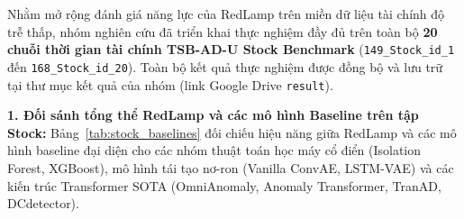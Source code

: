 \documentclass[sigconf,nonacm]{acmart}
\begin{document}
Nhằm mở rộng đánh giá năng lực của RedLamp trên miền dữ liệu tài chính độ trễ thấp, nhóm nghiên cứu đã triển khai thực nghiệm đầy đủ trên toàn bộ \textbf{20 chuỗi thời gian tài chính TSB-AD-U Stock Benchmark} (\texttt{149\_Stock\_id\_1} đến \texttt{168\_Stock\_id\_20}). Toàn bộ kết quả thực nghiệm được đồng bộ và lưu trữ tại thư mục kết quả của nhóm (link Google Drive \texttt{result}).

\textbf{1. Đối sánh tổng thể RedLamp và các mô hình Baseline trên tập Stock:}
Bảng~\ref{tab:stock_baselines} đối chiếu hiệu năng giữa RedLamp và các mô hình baseline đại diện cho các nhóm thuật toán học máy cổ điển (Isolation Forest, XGBoost), mô hình tái tạo nơ-ron (Vanilla ConvAE, LSTM-VAE) và các kiến trúc Transformer SOTA (OmniAnomaly, Anomaly Transformer, TranAD, DCdetector).

\begin{table}[htbp]
\centering
\caption{Bảng đối sánh hiệu năng giữa RedLamp và các mô hình Baseline trên bộ dữ liệu tài chính Stock (TSB-AD-U Finance)}
\label{tab:stock_baselines}
\footnotesize
{}
\end{table}
\end{document}
